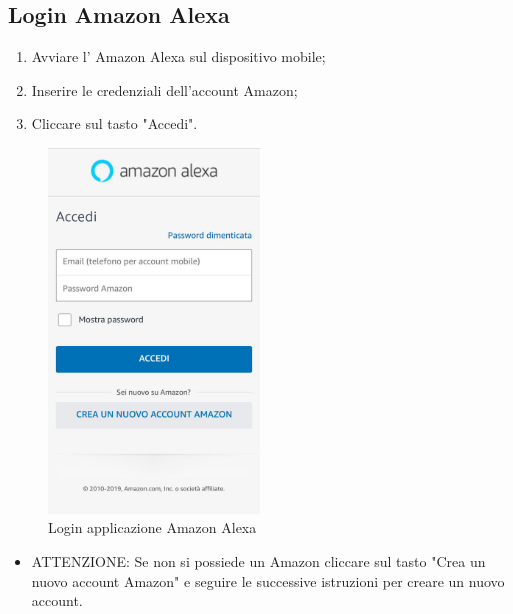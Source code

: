 \subsection{Login Amazon Alexa}
\begin{enumerate}
\item Avviare l' Amazon Alexa sul dispositivo mobile;
\item Inserire le credenziali dell'account Amazon; 
\item Cliccare sul tasto "Accedi".
\end{enumerate}
\begin{figure}[H]
	\centering
	\includegraphics[width=0.5\textwidth]{images/accessoAlexa.png}
	\caption{Login applicazione Amazon Alexa}
\end{figure}

\begin{itemize}
 \item  ATTENZIONE: Se non si possiede un  Amazon cliccare sul tasto "Crea un nuovo account Amazon" e seguire le successive istruzioni per creare un nuovo account.
 \end{itemize}
 

